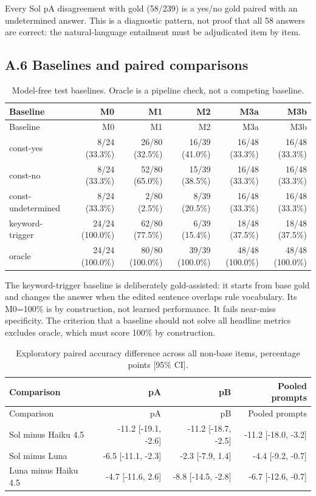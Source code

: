 \documentclass[11pt,a4paper]{article}
\begin{document}
Every Sol pA disagreement with gold (58/239) is a yes/no gold paired with an undetermined answer. This is a diagnostic pattern, not proof that all 58 answers are correct: the natural-language entailment must be adjudicated item by item.

\subsection*{A.6 Baselines and paired comparisons}

\begingroup\small\setlength{\tabcolsep}{4pt}
\begin{longtable}{lrrrrr}
\caption{Model-free test baselines. Oracle is a pipeline check, not a competing baseline.}\\
\toprule
Baseline & M0 & M1 & M2 & M3a & M3b \\
\midrule\endfirsthead
\toprule
Baseline & M0 & M1 & M2 & M3a & M3b \\
\midrule\endhead
\bottomrule\endfoot
const-yes & 8/24 (33.3\%) & 26/80 (32.5\%) & 16/39 (41.0\%) & 16/48 (33.3\%) & 16/48 (33.3\%) \\
const-no & 8/24 (33.3\%) & 52/80 (65.0\%) & 15/39 (38.5\%) & 16/48 (33.3\%) & 16/48 (33.3\%) \\
const-undetermined & 8/24 (33.3\%) & 2/80 (2.5\%) & 8/39 (20.5\%) & 16/48 (33.3\%) & 16/48 (33.3\%) \\
keyword-trigger & 24/24 (100.0\%) & 62/80 (77.5\%) & 6/39 (15.4\%) & 18/48 (37.5\%) & 18/48 (37.5\%) \\
oracle & 24/24 (100.0\%) & 80/80 (100.0\%) & 39/39 (100.0\%) & 48/48 (100.0\%) & 48/48 (100.0\%) \\
\end{longtable}\endgroup


The keyword-trigger baseline is deliberately gold-assisted: it starts from base gold and changes the answer when the edited sentence overlaps rule vocabulary. Its M0=100\% is by construction, not learned performance. It fails near-miss specificity. The criterion that a baseline should not solve all headline metrics excludes oracle, which must score 100\% by construction.

\begingroup\small\setlength{\tabcolsep}{4pt}
\begin{longtable}{lrrr}
\caption{Exploratory paired accuracy difference across all non-base items, percentage points [95\% CI].}\\
\toprule
Comparison & pA & pB & Pooled prompts \\
\midrule\endfirsthead
\toprule
Comparison & pA & pB & Pooled prompts \\
\midrule\endhead
\bottomrule\endfoot
Sol minus Haiku 4.5 & -11.2 [-19.1, -2.6] & -11.2 [-18.7, -2.5] & -11.2 [-18.0, -3.2] \\
Sol minus Luna & -6.5 [-11.1, -2.3] & -2.3 [-7.9, 1.4] & -4.4 [-9.2, -0.7] \\
Luna minus Haiku 4.5 & -4.7 [-11.6, 2.6] & -8.8 [-14.5, -2.8] & -6.7 [-12.6, -0.7] \\
\end{longtable}\endgroup
\end{document}
